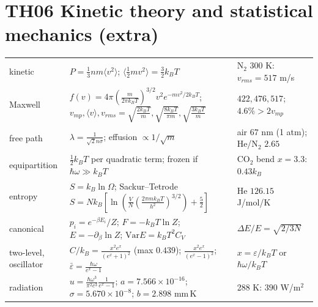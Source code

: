 \documentclass[9pt]{article}
\begin{document}
\section*{TH06 Kinetic theory and statistical mechanics (extra)}
\begin{tabular}{@{}p{2.9cm}p{8.4cm}p{6.1cm}@{}}
\toprule
kinetic & $P=\tfrac13nm\langle v^2\rangle$; $\langle\tfrac12mv^2\rangle=\tfrac32k_BT$ & N$_2$ 300 K: $v_{rms}=517$ m/s\\
Maxwell & $f(v)=4\pi(\tfrac m{2\pi k_BT})^{3/2}v^2e^{-mv^2/2k_BT}$; $v_{mp},\langle v\rangle,v_{rms}=\sqrt{\tfrac{2k_BT}m},\sqrt{\tfrac{8k_BT}{\pi m}},\sqrt{\tfrac{3k_BT}m}$ & $422,476,517$; $4.6\%>2v_{mp}$\\
free path & $\lambda=\tfrac1{\sqrt2n\sigma}$; effusion $\propto1/\sqrt m$ & air $67$ nm (1 atm); He/N$_2$ $2.65$\\
equipartition & $\tfrac12k_BT$ per quadratic term; frozen if $\hbar\omega\gg k_BT$ & CO$_2$ bend $x=3.3$: $0.43k_B$\\
entropy & $S=k_B\ln\Omega$; Sackur--Tetrode $S=Nk_B[\ln(\tfrac VN(\tfrac{2\pi mk_BT}{h^2})^{3/2})+\tfrac52]$ & He $126.15$ J/mol/K\\
canonical & $p_i=e^{-\beta E_i}/Z$; $F=-k_BT\ln Z$; $E=-\partial_\beta\ln Z$; $\mathrm{Var}E=k_BT^2C_V$ & $\Delta E/E=\sqrt{2/3N}$\\
two-level, oscillator & $C/k_B=\tfrac{x^2e^x}{(e^x+1)^2}$ (max $0.439$); $\tfrac{x^2e^x}{(e^x-1)^2}$; $\bar\varepsilon=\tfrac{\hbar\omega}{e^x-1}$ & $x=\varepsilon/k_BT$ or $\hbar\omega/k_BT$\\
radiation & $u=\tfrac{\hbar\omega^3}{\pi^2c^3}\tfrac1{e^x-1}$; $a=7.566\times10^{-16}$; $\sigma=5.670\times10^{-8}$; $b=2.898$ mm\,K & 288 K: $390$ W/m$^2$\\
\bottomrule
\end{tabular}
\end{document}
